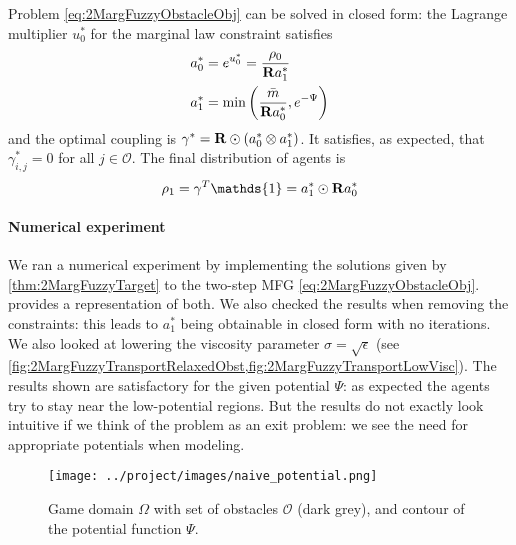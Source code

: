 \documentclass[../report.tex]{subfiles}
\begin{document}
\begin{prop}\label{thm:2MargFuzzyTarget}
Problem \eqref{eq:2MargFuzzyObstacleObj} can be solved in closed form: the Lagrange multiplier $u_0^*$ for the marginal law constraint satisfies
\begin{align*}
	a_0^* &= e^{u_0^*}  = \frac{\rho_0}{\mathbf{R} a^*_1}  \\
	a_1^* &= \min\left(\frac{\bar{m}}{\mathbf{R} a_0^*}, e^{-\Psi}\right)
\end{align*}
and the optimal coupling is $\gamma^* = \mathbf{R}\odot (a_0^* \otimes a_1^*)$.
It satisfies, as expected, that $\gamma^*_{i,j} = 0$ for all $j\in\mathscr{O}$. The final distribution of agents is
\[
	\rho_1 = \gamma^T\mathds{1} = a_1^* \odot \bfR a_0^*
\]
\end{prop}

 
\paragraph{Numerical experiment} We ran a numerical experiment by implementing the solutions given by \cref{thm:2MargFuzzyTarget} to the two-step MFG \eqref{eq:2MargFuzzyObstacleObj}.  provides a representation of both. We also checked the results when removing the constraints: this leads to $a^*_1$ being obtainable in closed form with no iterations. We also looked at lowering the viscosity parameter $\sigma = \sqrt{\epsilon}$ (see \cref{fig:2MargFuzzyTransportRelaxedObst,fig:2MargFuzzyTransportLowVisc}). The results shown are satisfactory for the given potential $\Psi$: as expected the agents try to stay near the low-potential regions. But the results do not exactly look intuitive if we think of the problem as an exit problem: we see the need for appropriate potentials when modeling.

\begin{figure}[!h]
	\centering
	\texttt{[image: ../project/images/naive\_potential.png]}
	\caption{Game domain $\Omega$ with set of obstacles $\mathscr{O}$ (dark grey), and contour of the potential function $\Psi$.} \label{fig:CrowdExamplePotential}	
\end{figure}
\end{document}
